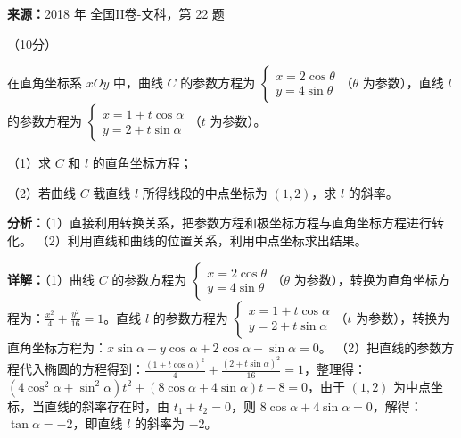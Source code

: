 \begin{question}[points=10]
\textbf{来源：}2018 年 全国II卷-文科，第 22 题\par
[选修4-4：坐标系与参数方程]（10分）

在直角坐标系 $xOy$ 中，曲线 $C$ 的参数方程为 $\begin{cases} x=2\cos\theta \\ y=4\sin\theta \end{cases}$（$\theta$ 为参数），直线 $l$ 的参数方程为 $\begin{cases} x=1+t\cos\alpha \\ y=2+t\sin\alpha \end{cases}$（$t$ 为参数）。

（1）求 $C$ 和 $l$ 的直角坐标方程；

（2）若曲线 $C$ 截直线 $l$ 所得线段的中点坐标为 $(1,2)$，求 $l$ 的斜率。
\begin{solution}

\textbf{分析：}（1）直接利用转换关系，把参数方程和极坐标方程与直角坐标方程进行转化。
（2）利用直线和曲线的位置关系，利用中点坐标求出结果。

\textbf{详解：}（1）曲线 $C$ 的参数方程为 $\begin{cases} x=2\cos\theta \\ y=4\sin\theta \end{cases}$（$\theta$ 为参数），转换为直角坐标方程为：$\frac{x^2}{4}+\frac{y^2}{16}=1$。直线 $l$ 的参数方程为 $\begin{cases} x=1+t\cos\alpha \\ y=2+t\sin\alpha \end{cases}$（$t$ 为参数），转换为直角坐标方程为：$x\sin\alpha-y\cos\alpha+2\cos\alpha-\sin\alpha=0$。
（2）把直线的参数方程代入椭圆的方程得到：$\frac{(1+t\cos\alpha)^2}{4}+\frac{(2+t\sin\alpha)^2}{16}=1$，整理得：$(4\cos^2\alpha+\sin^2\alpha)t^2+(8\cos\alpha+4\sin\alpha)t-8=0$，由于 $(1,2)$ 为中点坐标，当直线的斜率存在时，由 $t_1+t_2=0$，则 $8\cos\alpha+4\sin\alpha=0$，解得：$\tan\alpha=-2$，即直线 $l$ 的斜率为 $-2$。
\end{solution}
\end{question}

